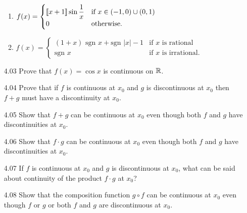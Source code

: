 \begin{enumerate}
\begin{enumerate}
                  \item $f(x) = \begin{cases}
                           \lbrack\!\lbrack x + 1 \rbrack\!\rbrack\displaystyle\sin\frac{1}{x}
                              & \text{if } x \in (-1, 0) \cup (0, 1) \\
                           0  & \text{otherwise}.
                        \end{cases}$
                  \item $f(x) = \begin{cases}
                           (1 + x)\text{ sgn }x + \text{sgn }|x| - 1
                              & \text{if } x \text{ is rational} \\
                           \text{sgn } x  & \text{if }x \text{ is irrational}.
                        \end{cases}$
               \end{enumerate}
   \item[4.03] Prove that $f(x) = \cos {x}$ is continuous on $\mathbb{R}$.
   \item[4.04] Prove that if $f$ is continuous at $x_0$ and $g$ is discontinuous
               at $x_0$ then $f + g$ must have a discontinuity at $x_0$.
   \item[4.05] Show that $f + g$ can be continuous at $x_0$ even though both $f$
               and $g$ have discontinuities at $x_0$.
   \item[4.06] Show that $f \cdot g$ can be continuous at $x_0$ even though 
               both $f$ and $g$ have discontinuities at $x_0$.
   \item[4.07] If $f$ is continuous at $x_0$ and $g$ is discontinuous at $x_0$,
               what can be said about continuity of the product $f \cdot g$ at
               $x_0$?
   \item[4.08] Show that the composition function $g \circ f$ can be continuous
               at $x_0$ even though $f$ or $g$ or both $f$ and $g$ are
               discontinuous at $x_0$.

\end{enumerate}

